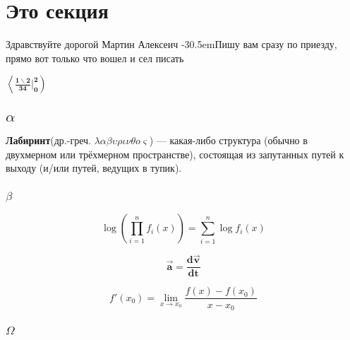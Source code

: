 \documentclass{article}
\begin{document}
    \section{Это секция}
        {\LARGE Здравствуйте дорогой Мартин Алексеич}
        \kern-30.5em{\tiny Пишу вам сразу по приезду, прямо вот только что вошел и сел писать}
    \begin{flushright}
    $\boldsymbol{\left\langle \frac{1 \backslash 2}{34} \Big |_{0}^{2} \right) }$
    \end{flushright}
    \subsection{$\alpha$}
        \textbf{Лабиринт}(др.-греч. $\lambda \alpha \beta \upsilon \rho \iota \nu \theta o \varsigma $) --- какая-либо структура (обычно в двухмерном или трёхмерном пространстве), состоящая из запутанных путей к
        выходу (и/или путей, ведущих в тупик).
    \subsubsection{$\beta$}
    \begin{multicols}{3}
    
        $$\log \left( \prod\limits_{i=1}^{n}f_i(x) \right)=\sum\limits_{i=1}^{n}\log f_i(x)$$
    
        $$\pmb{\vec{a}=\frac{d\vec{v}}{dt}}$$
    
        $$f'(x_0)=\lim \limits_{x \rightarrow x_0}\frac{f(x) - f(x_0)}{x - x_0}$$
    \end{multicols}
    \subsubsection{$\Omega$}
    \begin{multicols}{2}
        \lipsum[1-2]
    \end{multicols}
\end{document}
